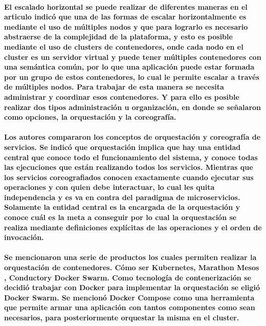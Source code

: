 \paragraph{
    El escalado horizontal se puede realizar de diferentes maneras en el articulo indicó que una de las formas de escalar horizontalmente es mediante el uso de múltiples nodos y que para lograrlo es necesario abstraerse de la complejidad de la plataforma, y esto es posible mediante el uso de clusters de contenedores, onde cada nodo en el cluster es un servidor virtual y puede tener múltiples contenedores con una semántica común,
    por lo que una aplicación puede estar formada por un grupo de estos contenedores, lo cual le permite escalar a través de múltiples nodos.
    Para trabajar de esta manera se necesita administrar y coordinar esos contenedores.
    Y para ello es posible realizar dos tipos administración u organización, en donde se señalaron como opciones, la orquestación y la coreografía.
}
\paragraph{
    Los autores compararon los conceptos de orquestación y coreografía de servicios. Se indicó que orquestación implica que hay una entidad central que conoce todo el funcionamiento del sistema, y conoce todas las ejecuciones que están realizando todos los servicios.
    Mientras que los servicios coreografiados conocen exactamente cuando ejecutar sus operaciones y con quien debe interactuar, lo cual les quita independencia y es va en contra del paradigma de microservicios.
    Solamente la entidad central es la encargada de la orquestación y conoce cuál es la meta a conseguir por lo cual la orquestación se realiza mediante definiciones explícitas de las operaciones y el orden de invocación.
}

\paragraph{
    Se mencionaron una serie de productos los cuales permiten realizar la orquestación de contenedores.
    Cómo ser Kubernetes, Marathon Mesos \cite{matathonMesos}, Conductor\cite{conductor}y Docker Swarm\cite{dockerSwarm}.
    Como tecnología de contenerización se decidió trabajar con Docker para implementar la orquestación se eligió  Docker Swarm. Se mencionó Docker Compose\cite{dockerCompose} como una herramienta que permite armar una aplicación con tantos componentes como sean necesarios, para posteriormente orquestar la misma en el cluster.
}

